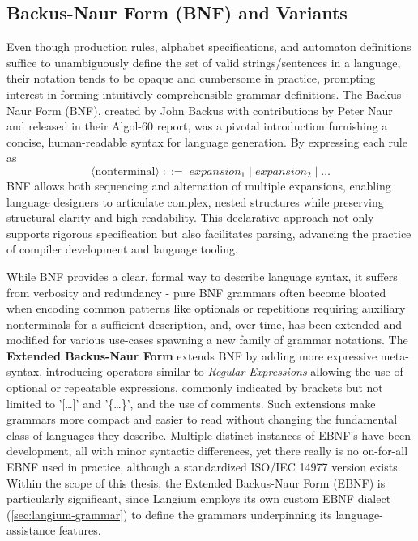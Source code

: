 \subsection{Backus-Naur Form (BNF) and Variants}
Even though production rules, alphabet specifications, and automaton definitions suffice to unambiguously define the set of valid strings/sentences in a language, their notation
tends to be opaque and cumbersome in practice, prompting interest in forming intuitively comprehensible grammar definitions. The Backus-Naur Form (BNF),
created by John Backus with contributions by Peter Naur and released in their Algol-60 report\cite{ALGOL60}, was a pivotal introduction furnishing a concise, human-readable syntax for language generation.
By expressing each rule as
\[
  \langle\mathrm{nonterminal}\rangle \;::=\; expansion_1 \;|\; expansion_2 \;|\;\dots
\]
BNF allows both sequencing and alternation of multiple expansions, enabling language designers to articulate complex, nested structures while preserving structural
clarity and high readability.
This declarative approach not only supports rigorous specification but also facilitates parsing, advancing the practice of compiler development and
language tooling.

While BNF provides a clear, formal way to describe language syntax, it suffers from verbosity and redundancy - pure BNF grammars often become bloated when encoding
common patterns like optionals or repetitions requiring auxiliary nonterminals for a sufficient description, and, over time, has been extended and modified for various
use-cases spawning a new family of grammar notations. The \textbf{Extended Backus-Naur Form} extends BNF by adding more expressive meta-syntax, introducing operators
similar to \textit{Regular Expressions} allowing the use of optional or repeatable expressions, commonly indicated by brackets but not limited to '[\dots]' and '\{\dots\}',
and the use of comments. Such extensions make grammars more compact and easier to read without changing the fundamental class of languages they describe.
Multiple distinct instances of EBNF's have been development, all with minor syntactic differences, yet there really is no on-for-all EBNF used in practice, although
a standardized ISO/IEC 14977 version exists. \cite{jinks2004bnf,jinks2004ebnfvariants}\\
Within the scope of this thesis, the Extended Backus-Naur Form (EBNF) is particularly significant, since Langium employs its own custom EBNF dialect (\ref{sec:langium-grammar})
to define the grammars underpinning its language-assistance features.


